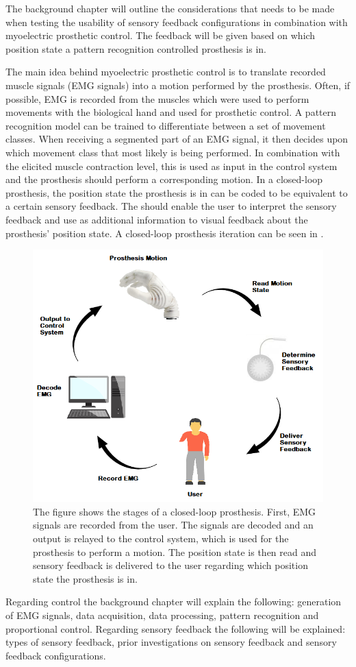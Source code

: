 The background chapter will outline the considerations that needs to be made when testing the usability of sensory feedback configurations in combination with myoelectric prosthetic control. The feedback will be given based on which position state a pattern recognition controlled prosthesis is in. 

The main idea behind myoelectric prosthetic control is to translate recorded muscle signals (EMG signals) into a motion performed by the prosthesis. Often, if possible, EMG is recorded from the muscles which were used to perform movements with the biological hand and used for prosthetic control. A pattern recognition model can be trained to differentiate between a set of movement classes. When receiving a segmented part of an EMG signal, it then decides upon which movement class that most likely is being performed. In combination with the elicited muscle contraction level, this is used as input in the control system and the prosthesis should perform a corresponding motion. \cite{Guanglin2010} In a closed-loop prosthesis, the position state the prosthesis is in can be coded to be equivalent to a certain sensory feedback. The should enable the user to interpret the sensory feedback and use as additional information to visual feedback about the prosthesis' position state. \cite{Strbac2016} A closed-loop prosthesis iteration can be seen in . 

\begin{figure}[H]                 
	\includegraphics[width=.65\textwidth]{figures/closed_loop_pros}  
	\caption{The figure shows the stages of a closed-loop prosthesis. First, EMG signals are recorded from the user. The signals are decoded and an output is relayed to the control system, which is used for the prosthesis to perform a motion. The position state is then read and sensory feedback is delivered to the user regarding which position state the prosthesis is in.}
	\label{fig:closed_loop_pros} 
\end{figure}
Regarding control the background chapter will explain the following: generation of EMG signals, data acquisition, data processing, pattern recognition and proportional control. Regarding sensory feedback the following will be explained: types of sensory feedback, prior investigations on sensory feedback and sensory feedback configurations. 

